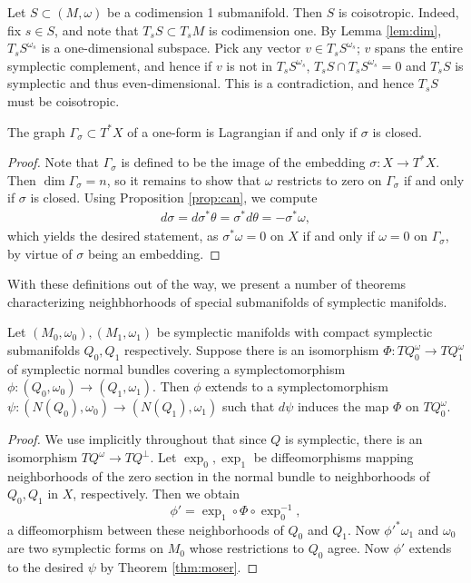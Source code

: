 \documentclass{amsart}
\begin{document}
\begin{example}
    Let $S\subset (M,\omega)$ be a codimension 1 submanifold. Then $S$ is coisotropic.
    Indeed, fix $s\in S$, and note that $T_sS\subset T_sM$ is codimension one. By Lemma
    \ref{lem:dim}, $T_sS^{\omega_s}$ is a one-dimensional subspace. Pick any vector
    $v\in T_sS^{\omega_s}$; $v$ spans the entire symplectic complement, and hence if $v$
    is not in $T_sS^{\omega_s}$, $T_sS\cap T_sS^{\omega_s}=0$ and $T_sS$ is symplectic
    and thus even-dimensional. This is a contradiction, and hence $T_sS$ must be
    coisotropic.
\end{example}

\begin{proposition}
    The graph $\Gamma_\sigma\subset T^*X$ of a one-form is Lagrangian if and only if $\sigma$
    is closed.
\end{proposition}
\begin{proof}
    Note that $\Gamma_\sigma$ is defined to be the image of the embedding $\sigma:X\to T^*X$.
    Then $\dim\Gamma_\sigma=n$, so it remains to show that $\omega$
    restricts to zero on $\Gamma_\sigma$ if and only if $\sigma$ is closed. Using Proposition
    \ref{prop:can}, we compute
    \begin{align*}
        d\sigma = d\sigma^*\theta=\sigma^*d\theta=-\sigma^*\omega,
    \end{align*}
    which yields the desired statement, as $\sigma^*\omega=0$ on $X$ if and only if $\omega=0$
    on $\Gamma_\sigma$, by virtue of $\sigma$ being an embedding.
\end{proof}

With these definitions out of the way, we present a number of theorems characterizing
neighbhorhoods of special submanifolds of symplectic manifolds. 

\begin{theorem}
    Let $(M_0,\omega_0),(M_1,\omega_1)$ be symplectic manifolds with compact symplectic
    submanifolds $Q_0,Q_1$ respectively. Suppose there is an isomorphism $\Phi:TQ_0^\omega\to TQ_1^\omega$
    of symplectic normal bundles covering a symplectomorphism $\phi:(Q_0,\omega_0)\to(Q_1,\omega_1)$.
    Then $\phi$ extends to a symplectomorphism $\psi:(N(Q_0),\omega_0)\to(N(Q_1),\omega_1)$
    such that $d\psi$ induces the map $\Phi$ on $TQ_0^{\omega}$.
\end{theorem}
\begin{proof}
    We use implicitly throughout that since $Q$ is symplectic, there is an isomorphism $TQ^\omega\to TQ^\perp$.
    Let $\exp_0,\exp_1$ be diffeomorphisms mapping neighborhoods of the zero section
    in the normal bundle to neighborhoods of $Q_0,Q_1$ in $X$, respectively. Then
    we obtain 
    \begin{equation*}
        \phi' = \exp_1\circ\Phi\circ\exp_0^{-1},
    \end{equation*}
    a diffeomorphism between these neighborhoods of $Q_0$ and $Q_1$. Now $\phi'^*\omega_1$
    and $\omega_0$ are two symplectic forms on $M_0$ whose restrictions to $Q_0$ agree.
    Now $\phi'$ extends to the desired $\psi$ by Theorem \ref{thm:moser}.
\end{proof}
\end{document}
